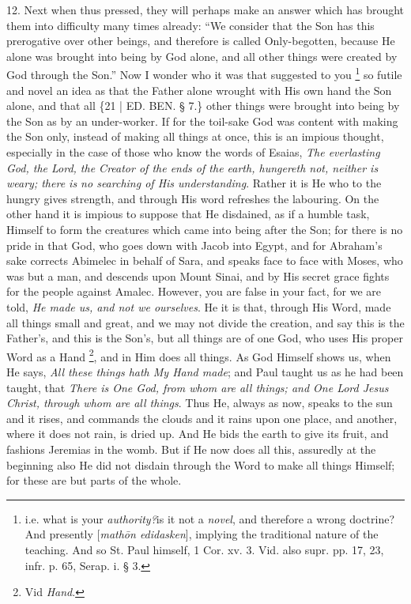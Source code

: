 12. Next when thus pressed,
they will perhaps make an answer which has brought them into
difficulty many times already: ``We consider that the Son has this
prerogative over other beings, and therefore is called Only-begotten,
because He alone was brought into being by God alone, and all other
things were created by God through the Son.'' Now I wonder who it was
that suggested to you \footnote{i.e. what is your \emph{authority?}is it not a \emph{novel}, and
therefore a wrong doctrine? And presently [\emph{math\={o}n edidasken}],
implying the traditional nature of the teaching. And so St. Paul
himself, 1 Cor. xv. 3. Vid. also supr. pp. 17, 23, infr. p. 65, Serap.
i. § 3.}
so futile and novel an idea as that the Father alone wrought with His
own hand the Son alone, and that all \{21 | ED.
BEN. § 7.\} other things were brought into
being by the Son as by an under-worker. If for the toil-sake God was
content with making the Son only, instead of making all things at
once, this is an impious thought, especially in the case of those who
know the words of Esaias, \emph{The everlasting God, the Lord, the
Creator of the ends of the earth, hungereth not, neither is weary;
there is no searching of His understanding}. Rather it is He who to
the hungry gives strength, and through His word refreshes the
labouring. On the other hand it is impious to suppose that He
disdained, as if a humble task, Himself to form the creatures which
came into being after the Son; for there is no pride in that God, who
goes down with Jacob into Egypt, and for Abraham's sake corrects
Abimelec in behalf of Sara, and speaks face to face with Moses, who
was but a man, and descends upon Mount Sinai, and by His secret grace
fights for the people against Amalec. However, you are false in your
fact, for we are told, \emph{He made us, and not we ourselves}. He it
is that, through His Word, made all things small and great, and we may
not divide the creation, and say this is the Father's, and this is the
Son's, but all things are of one God, who uses His proper Word as a
Hand \footnote{Vid \emph{Hand}.}, and in Him does
all things. As God Himself shows us, when He says, \emph{All these things
hath My Hand made}; and Paul taught us as he had been taught, that \emph{There
is One God, from whom are all things; and One Lord Jesus Christ,
through whom are all things}. Thus He, always as now, speaks to the
sun and it rises, and commands the clouds and it rains upon one place,
and another, where it does not rain, is dried up. And He bids the
earth to give its fruit, and fashions Jeremias in the womb. But if He
now does all this, assuredly at the beginning also He did not disdain
through the Word to make all things Himself; for these are but parts
of the whole.

